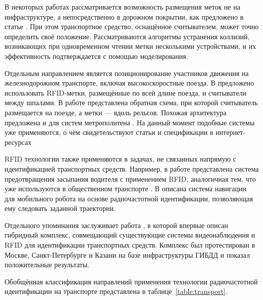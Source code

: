 \documentclass[12pt]{article}
\theoremstyle{definition}
\begin{document}
В некоторых работах рассматривается возможность размещения меток не на инфраструктуре, а непосредственно в дорожном покрытии, как предложено в статье \cite{Qin2021}. При этом транспортное средство, оснащённое считывателем, может точно определить своё положение. Рассматриваются алгоритмы устранения коллизий, возникающих при одновременном чтении метки несколькими устройствами, и их эффективность подтверждается с помощью моделирования.

Отдельным направлением является позиционирование участников движения на железнодорожном транспорте, включая высокоскоростные поезда. В \cite{Zhang2010, Zhang2011} предложено использовать RFID-метки, размещённые по всей длине поезда, и считыватели между шпалами. В работе \cite{Buffi2017t} представлена обратная схема, при которой считыватель размещается на поезде, а метки — вдоль рельсов. Похожая архитектура предложена и для систем метрополитена \cite{Kostrominov2020}. На данный момент подобные системы уже применяются, о чём свидетельствуют статьи и спецификации в интернет-ресурсах \cite{train_pos_system, tag_master}

RFID технологии также применяются в задачах, не связанных напрямую с идентификацией транспортных средств. Например, в работе \cite{Yang2020} представлена система предотвращения засыпания водителя с применением RFID, аналогичная тем, что уже используются в общественном транспорте \cite{mosmetro_site}. В \cite{Teng2010} описана система навигации для мобильного робота на основе радиочастотной идентификации, позволяющая ему следовать заданной траектории.

Отдельного упоминания заслуживает работа \cite{Vishnevsky2022}, в которой впервые описан гибридный комплекс, совмещающий существующие системы видеонаблюдения и RFID для идентификации транспортных средств. Комплекс был протестирован в Москве, Санкт-Петербурге и Казани на базе инфраструктуры ГИБДД и показал положительные результаты.

Обобщённая классификация направлений применения технологии радиочастотной идентификации на транспорте представлена в таблице~\ref{table:transport}.
\end{document}
